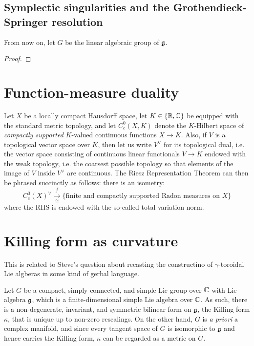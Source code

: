         \subsection{Symplectic singularities and the Grothendieck-Springer resolution}
            \begin{convention}
                From now on, let $G$ be the linear algebraic group of $\mathfrak{g}$. 
            \end{convention}

            \begin{lemma}
                
            \end{lemma}
                \begin{proof}
                    
                \end{proof}

    \section{Function-measure duality}
        Let $X$ be a locally compact Hausdorff space, let $K \in \{\mathbb{R}, \mathbb{C}\}$ be equipped with the standard metric topology, and let $C^0_c(X, K)$ denote the $K$-Hilbert space of \textit{compactly supported} $K$-valued continuous functions $X \to K$. Also, if $V$ is a topological vector space over $K$, then let us write $V^{\vee}$ for its topological dual, i.e. the vector space consisting of continuous linear functionals $V \to K$ endowed with the weak topology, i.e. the coarsest possible topology so that elements of the image of $V$ inside $V^{\vee}$ are continuous. The Riesz Representation Theorem can then be phrased succinctly as follows: there is an isometry:
            $$C^0_c(X)^{\vee} \xrightarrow[\cong]{\int} \{ \text{finite and compactly supported Radon measures on $X$} \}$$
        where the RHS is endowed with the so-called total variation norm.

    \section{Killing form as curvature}
        This is related to Steve's question about recasting the constructino of $\gamma$-toroidal Lie algberas in some kind of gerbal language.
    
        Let $G$ be a compact, simply connected, and simple Lie group over $\mathbb{C}$ with Lie algebra $\mathfrak{g}$, which is a finite-dimensional simple Lie algebra over $\mathbb{C}$. As such, there is a non-degenerate, invariant, and symmetric bilinear form on $\mathfrak{g}$, the Killing form $\kappa$, that is unique up to non-zero rescalings. On the other hand, $G$ is \textit{a priori} a complex manifold, and since every tangent space of $G$ is isomorphic to $\mathfrak{g}$ and hence carries the Killing form, $\kappa$ can be regarded as a metric on $G$.
        
